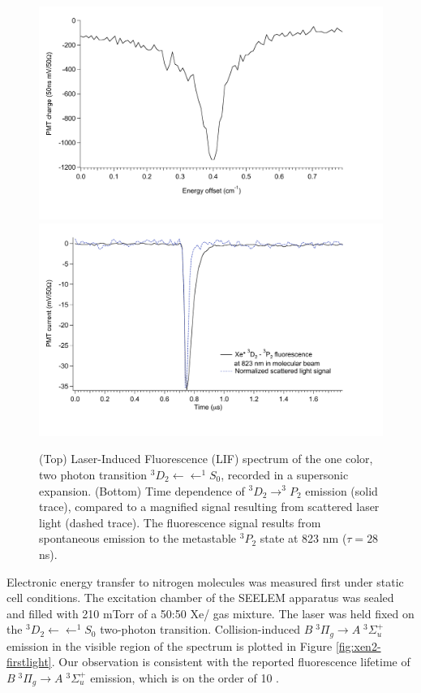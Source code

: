 \documentclass[12pt]{mitthesis}
\begin{document}
\begin{figure}
  \caption{(Top) Laser-Induced Fluorescence (LIF) spectrum of the one
    color, two photon transition  $^3D_2 \leftarrow \leftarrow
    ^1S_0$, recorded in a supersonic expansion.  (Bottom) Time
    dependence of  $^3D_2 \rightarrow ^3P_2$ emission (solid
    trace), compared to a magnified signal resulting from scattered
    laser light (dashed trace). The fluorescence signal results from
    spontaneous emission to the metastable $^3P_2$ state at 823 nm
    ($\tau = 28$ ns).  }
  \label{fig:xe-beam}
  \centering
  \includegraphics[width=6in]{Xe-beamlif-060406.pdf}
  \includegraphics[width=6in]{Xe-beamtrc-060406.pdf}
\end{figure}

Electronic energy transfer to nitrogen molecules was measured first
under static cell conditions.  The excitation chamber of the SEELEM
apparatus was sealed and filled with 210 mTorr of a 50:50 Xe/
gas mixture.  The laser was held fixed on the  $^3D_2
\leftarrow \leftarrow ^1S_0$ two-photon transition.  Collision-induced
 $B \; ^3\Pi_g \rightarrow A \; ^3\Sigma_u^+$ emission in the visible
region of the spectrum is plotted in Figure \ref{fig:xen2-firstlight}.
Our observation is consistent with the reported fluorescence lifetime
of  $B \; ^3\Pi_g \rightarrow A \; ^3\Sigma_u^+$ emission, which is on the
order of 10 \microsec.
\end{document}
